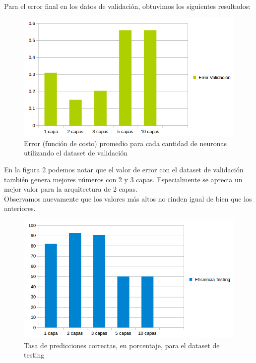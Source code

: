 Para el error final en los datos de validación, obtuvimos los siguientes resultados:\\

\begin{figure}[h]
  \begin{center}
  \includegraphics[scale=0.75]{graficos/fig2_cant_capas_error_valid.png}
  \caption{Error (función de costo) promedio para cada cantidad de neuronas utilizando el dataset de validación}
  \end{center}
\end{figure}


En la figura 2 podemos notar que el valor de error con el dataset de validación también 
genera mejores números con 2 y 3 capas. Especialmente se aprecia un mejor valor para la arquitectura de 2 capas.\\
Observamos nuevamente que los valores más altos no rinden igual de bien que los anteriores.

\begin{figure}[h]
  \begin{center}
  \includegraphics[scale=0.75]{graficos/fig3_cant_capas_testing.png}
  \caption{Tasa de predicciones correctas, en porcentaje, para el dataset de testing}
  \end{center}
\end{figure}

